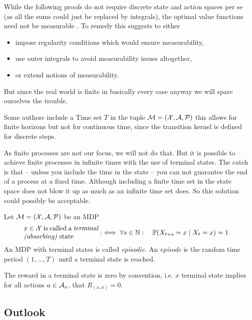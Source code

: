 \begin{remark}
	While the following proofs do not require discrete state and action spaces per se (as all the sums could just be replaced by integrals), the optimal value functions need not be measurable \parencite[157]{putermanMarkovDecisionProcesses2005} . To remedy this \citeauthor{putermanMarkovDecisionProcesses2005} suggests to either
	\begin{itemize}[noitemsep]
		\item impose regularity conditions which would ensure measurability,
		\item use outer integrals to avoid measurability issues altogether,
		\item or extend notions of measurability.
	\end{itemize}
	But since the real world is finite in basically every case anyway we will spare ourselves the trouble. 
\end{remark}

Some authors include a Time set \(T\) in the tuple \(\mathcal{M}=(\mathcal{X},\mathcal{A},\mathcal{P})\) \parencite[e.g.][]{putermanMarkovDecisionProcesses2005} this allows for finite horizons but not for continuous time, since the transition kernel is defined for discrete steps.


As finite processes are not our focus, we will not do that. But it is possible to achieve finite processes in infinite times with the use of terminal states. The catch is that -- unless you include the time in the state -- you can not guarantee the end of a process at a fixed time. Although including a finite time set in the state space does not blow it up as much as an infinite time set does. So this solution could possibly be acceptable.

\begin{definition} Let \(\mathcal{M}=(\mathcal{X},\mathcal{A},\mathcal{P})\) be an MDP
	\[
		\parbox{11em}{\(x\in\cX \) is called a \emph{terminal (absorbing)} state} :\iff \forall s\in\N:\quad \Pr(X_{t+s}=x\mid X_t=x)=1
	\]
	An MDP with terminal states is called \emph{episodic}.
	An \emph{episode} is the random time period \((1,\dots,T)\) until a terminal state is reached.
\end{definition}
\begin{remark} The reward in a terminal state is zero by convention, i.e. \(x\) terminal state implies for all actions \(a\in\mathcal{A}_x\), that \(R_{(x,a)}=0\).
\end{remark}

\subsection{Outlook}

